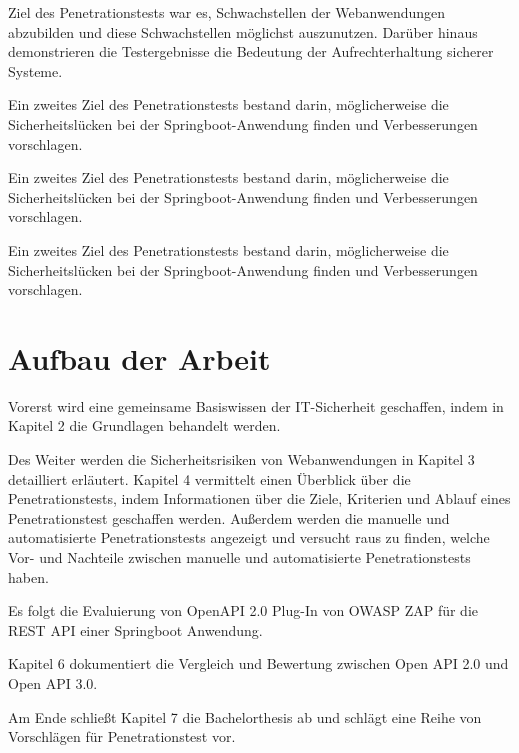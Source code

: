 Ziel des Penetrationstests war es, Schwachstellen der Webanwendungen abzubilden und diese Schwachstellen möglichst auszunutzen. Darüber hinaus demonstrieren die Testergebnisse die Bedeutung der Aufrechterhaltung sicherer Systeme.

Ein zweites Ziel des Penetrationstests bestand darin, möglicherweise die Sicherheitslücken bei der Springboot-Anwendung finden und Verbesserungen vorschlagen.

Ein zweites Ziel des Penetrationstests bestand darin, möglicherweise die Sicherheitslücken bei der Springboot-Anwendung finden und Verbesserungen vorschlagen.

Ein zweites Ziel des Penetrationstests bestand darin, möglicherweise die Sicherheitslücken bei der Springboot-Anwendung finden und Verbesserungen vorschlagen.

\section{Aufbau der Arbeit}

Vorerst wird eine gemeinsame Basiswissen der IT-Sicherheit geschaffen, indem in Kapitel 2 die Grundlagen behandelt werden. 

Des Weiter werden die Sicherheitsrisiken von Webanwendungen in Kapitel 3  detailliert erläutert. Kapitel 4 vermittelt einen Überblick über die Penetrationstests, indem Informationen über die Ziele, Kriterien und Ablauf eines Penetrationstest geschaffen werden. Außerdem werden die manuelle und automatisierte Penetrationstests angezeigt und versucht raus zu finden, welche Vor- und Nachteile zwischen manuelle und automatisierte Penetrationstests haben. 

Es folgt die Evaluierung von OpenAPI 2.0 Plug-In von OWASP ZAP für die REST API einer Springboot Anwendung. 

Kapitel 6 dokumentiert die Vergleich und Bewertung zwischen Open API 2.0 und Open API 3.0. 

Am Ende schließt Kapitel 7 die Bachelorthesis ab und schlägt eine Reihe von Vorschlägen für Penetrationstest vor.

